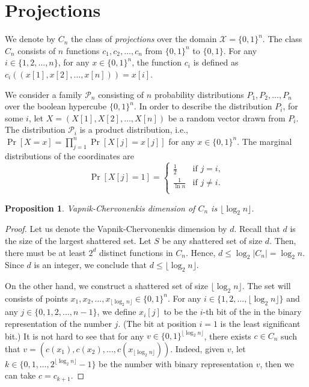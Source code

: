 \documentclass[10pt]{article}
\newtheorem{proposition}{Proposition}
\renewcommand{\P}{\mathcal{P}}
\newcommand{\X}{\mathcal{X}}
\begin{document}
\section{Projections}

We denote by $C_n$ the class of \emph{projections} over the domain $\X = \{0,1\}^n$. The
class $C_n$ consists of $n$ functions $c_1, c_2, \dots, c_n$ from $\{0,1\}^n$ to
$\{0,1\}$. For any $i \in \{1,2,\dots,n\}$, for any $x \in \{0,1\}^n$,
the function $c_i$ is defined as $c_i((x[1], x[2], \dots, x[n])) = x[i]$.

We consider a family $\P_n$ consisting of $n$ probability distributions $P_1,
P_2, \dots, P_n$ over the boolean hypercube $\{0,1\}^n$. In order to describe
the distribution $P_i$, for some $i$, let $X = (X[1], X[2], \dots, X[n])$ be a
random vector drawn from $P_i$. The distribution $\P_i$ is a product
distribution, i.e., $\Pr[X = x] = \prod_{j=1}^n \Pr[X[j] = x[j]]$ for any $x \in
\{0,1\}^n$. The marginal distributions of the coordinates are
$$
\Pr[X[j] = 1] =
\begin{cases}
\frac{1}{2} & \text{if $j = i$,} \\
\frac{1}{\ln n} & \text{if $j\neq i$.} \\
\end{cases}
$$

\begin{proposition}
\label{proposition:vc-dimension-projections}
Vapnik-Chervonenkis dimension of $C_n$ is $\lfloor \log_2 n \rfloor$.
\end{proposition}

\begin{proof}
Let us denote the Vapnik-Chervonenkis dimension by $d$. Recall that $d$ is the
size of the largest shattered set. Let $S$ be any shattered set of size $d$.
Then, there must be at least $2^d$ distinct functions in $C_n$. Hence, $d \le
\log_2 |C_n| = \log_2 n$. Since $d$ is an integer, we conclude that $d \le
\lfloor \log_2 n \rfloor$.

On the other hand, we construct a shattered set of size $\lfloor \log_2 n
\rfloor$. The set will consists of points $x_1, x_2, \dots, x_{\lfloor \log_2 n
\rfloor} \in \{0,1\}^n$. For any $i \in \{1,2,\dots,\lfloor \log_2 n \rfloor\}$
and any $j \in \{0,1,2,\dots,n-1\}$, we define $x_i[j]$ to be the $i$-th bit of the
in the binary representation of the number $j$. (The bit at position $i=1$ is the
least significant bit.) It is not hard to see that for any $v \in
\{0,1\}^{\lfloor \log_2 n \rfloor}$, there exists $c \in C_n$ such that $v =
(c(x_1), c(x_2), \dots, c(x_{\lfloor \log_2 n \rfloor}))$. Indeed, given $v$,
let $k \in \{0,1,\dots,2^{\lfloor \log_2 n \rfloor} - 1\}$ be the number with
binary representation $v$, then we can take $c = c_{k+1}$.
\end{proof}
\end{document}
